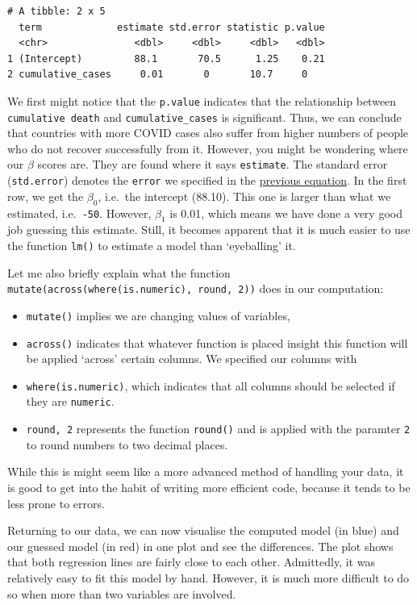 \documentclass[
  letterpaper,
]{krantz}
\begin{document}
\begin{verbatim}
# A tibble: 2 x 5
  term             estimate std.error statistic p.value
  <chr>               <dbl>     <dbl>     <dbl>   <dbl>
1 (Intercept)         88.1       70.5      1.25    0.21
2 cumulative_cases     0.01       0       10.7     0   
\end{verbatim}

We first might notice that the \texttt{p.value} indicates that the
relationship between \texttt{cumulative\ death} and
\texttt{cumulative\_cases} is significant. Thus, we can conclude that
countries with more COVID cases also suffer from higher numbers of
people who do not recover successfully from it. However, you might be
wondering where our \(\beta\) scores are. They are found where it says
\texttt{estimate}. The standard error (\texttt{std.error}) denotes the
\texttt{error} we specified in the
\hyperref[single-linear-regression]{previous equation}. In the first
row, we get the \(\beta_0\), i.e.~the intercept (88.10). This one is
larger than what we estimated, i.e.~\texttt{-50}. However, \(\beta_1\)
is 0.01, which means we have done a very good job guessing this
estimate. Still, it becomes apparent that it is much easier to use the
function \texttt{lm()} to estimate a model than `eyeballing' it.

Let me also briefly explain what the function
\texttt{mutate(across(where(is.numeric),\ round,\ 2))} does in our
computation:

\begin{itemize}
\item
  \texttt{mutate()} implies we are changing values of variables,
\item
  \texttt{across()} indicates that whatever function is placed insight
  this function will be applied `across' certain columns. We specified
  our columns with
\item
  \texttt{where(is.numeric)}, which indicates that all columns should be
  selected if they are \texttt{numeric}.
\item
  \texttt{round,\ 2} represents the function \texttt{round()} and is
  applied with the paramter \texttt{2} to round numbers to two decimal
  places.
\end{itemize}

While this is might seem like a more advanced method of handling your
data, it is good to get into the habit of writing more efficient code,
because it tends to be less prone to errors.

Returning to our data, we can now visualise the computed model (in blue)
and our guessed model (in red) in one plot and see the differences. The
plot shows that both regression lines are fairly close to each other.
Admittedly, it was relatively easy to fit this model by hand. However,
it is much more difficult to do so when more than two variables are
involved.
\end{document}
